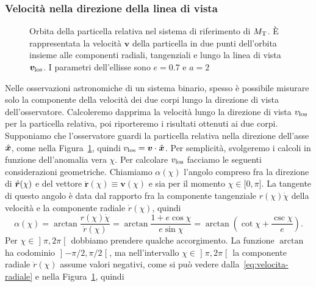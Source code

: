 {\subsubsection{Velocità nella direzione della linea di vista}
\label{sec:velocita-linea-di-vista}

\begin{figure}
  \centering
  
  \caption[Velocità nella direzione della linea di vista]{Orbita della
    particella relativa nel sistema di riferimento di $M_\textup{T}$. È
    rappresentata la velocità $\bm{v}$ della particella in due punti dell'orbita
    insieme alle componenti radiali, tangenziali e lungo la linea di vista
    $\bm{v}_\textup{los}$. I parametri dell'ellisse sono $e=0.7$ e $a=2$}
  \label{fig:ellisse-vlos}
\end{figure}
Nelle osservazioni astronomiche di un sistema binario, spesso è possibile
misurare solo la componente della velocità dei due corpi lungo la direzione di
vista dell'osservatore. Calcoleremo dapprima la velocità lungo la direzione di
vista $v_\textup{los}$ per la particella relativa, poi riporteremo i risultati
ottenuti ai due corpi. Supponiamo che l'osservatore guardi la particella
relativa nella direzione dell'asse $\hat{\bm{x}}$, come nella
Figura~\ref{fig:ellisse-vlos}, quindi $v_\textup{los} = \bm{v}\cdot\hat{\bm{x}}$.
Per semplicità, svolgeremo i calcoli in funzione dell'anomalia vera $\chi$. Per
calcolare $v_\textup{los}$ facciamo le seguenti considerazioni
geometriche. Chiamiamo $\alpha(\chi)$ l'angolo compreso fra la direzione di
$\hat{\bm{r}}(\chi)$ e del vettore $\dot{\bm{r}}(\chi) \equiv \bm{v}(\chi)$ e sia
per il momento $\chi \in \mathopen{[}0, \pi\mathclose{]}$. La tangente di questo
angolo è data dal rapporto fra la componente tangenziale $r(\chi)\dot{\chi}$
della velocità e la componente radiale $\dot{r}(\chi)$, quindi
\begin{equation}
  \label{eq:angolo-alpha}
  \alpha(\chi) = \arctan\frac{r(\chi)\dot{\chi}}{\dot{r}(\chi)} =
  \arctan\frac{1 + e\cos\chi}{e\sin\chi} = \arctan
  \left(
    \cot\chi + \frac{\csc\chi}{e}
  \right).
\end{equation}
Per $\chi \in \mathopen{]}\pi, 2\pi\mathclose{[}$ dobbiamo prendere qualche
accorgimento. La funzione $\arctan$ ha codominio
$\mathopen{]}-\pi/2, \pi/2\mathclose{[}$, ma nell'intervallo
$\chi \in \mathopen{]}\pi, 2\pi\mathclose{[}$ la componente radiale
$\dot{r}(\chi)$ assume valori negativi, come si può vedere
dalla~\eqref{eq:velocita-radiale} e nella Figura~\ref{fig:ellisse-vlos}, quindi
}

